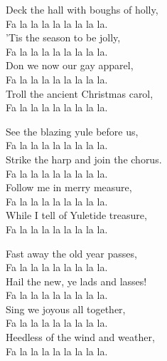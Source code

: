 
\strofa Deck the hall with boughs of holly,\\
Fa la la la la la la la la.\\
'Tis the season to be jolly,\\
Fa la la la la la la la la.\\
Don we now our gay apparel,\\
Fa la la la la la la la la.\\
Troll the ancient Christmas carol,\\
Fa la la la la la la la la.

\spazio

\strofa See the blazing yule before us,\\
Fa la la la la la la la la.\\
Strike the harp and join the chorus.\\
Fa la la la la la la la la.\\
Follow me in merry measure,\\
Fa la la la la la la la la.\\
While I tell of Yuletide treasure,\\
Fa la la la la la la la la.

\spazio

\strofa Fast away the old year passes,\\
Fa la la la la la la la la.\\
Hail the new, ye lads and lasses!\\
Fa la la la la la la la la.\\
Sing we joyous all together,\\
Fa la la la la la la la la.\\
Heedless of the wind and weather,\\
Fa la la la la la la la la.
